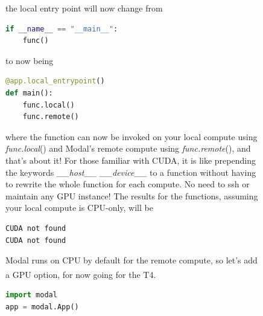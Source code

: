 \documentclass[12pt]{article}
\newcommand{\sidecite}[1]{\textsuperscript{\textcolor{blue}{\textbf{\scriptsize#1}}}}
\newcommand{\maincitecount}{\sidecite{\stepcounter{maincite}\themaincite}}
\begin{document}
\pagebreak
\begin{figure}[!htb]
    \begin{minipage}[t]{0.65\textwidth}
    \raggedright
the local entry point will now change from 
\begin{lstlisting}[language=python,style=python,basicstyle=\ttfamily\footnotesize]
if __name__ == "__main__":
    func()
\end{lstlisting}
to now being
\begin{lstlisting}[language=python,style=python,basicstyle=\ttfamily\footnotesize]
@app.local_entrypoint()
def main():
    func.local()
    func.remote()
\end{lstlisting}
where the function can now be invoked on your local compute using
{\it func.local}() and Modal's remote compute using {\it func.remote}(),
and that's about it! For those familiar with CUDA, it is like prepending 
the keywords {\it \_\_host\_\_ \_\_device\_\_} to a function without having to 
rewrite the whole function for each compute. No need to ssh or maintain any GPU instance! 
The results for the functions, assuming your local compute is CPU-only, 
will be 
\begin{lstlisting}[language=bash,basicstyle=\ttfamily\footnotesize]
CUDA not found
CUDA not found
\end{lstlisting}
Modal runs on CPU by default for the remote compute, so let's add a GPU option{\maincitecount}, for now going for the T4.
\begin{lstlisting}[language=python,style=python,basicstyle=\ttfamily\footnotesize]
import modal 
app = modal.App()


\end{lstlisting}
\end{minipage}
\end{figure}
\end{document}
